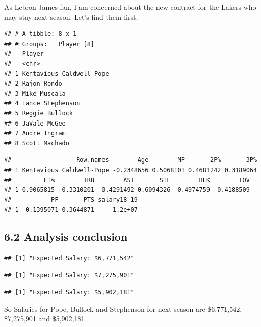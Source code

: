 \documentclass[]{article}
\begin{document}
As Lebron James fan, I am concerned about the new contract for the
Lakers who may stay next season. Let's find them first.

\begin{verbatim}
## # A tibble: 8 x 1
## # Groups:   Player [8]
##   Player                  
##   <chr>                   
## 1 Kentavious Caldwell-Pope
## 2 Rajon Rondo             
## 3 Mike Muscala            
## 4 Lance Stephenson        
## 5 Reggie Bullock          
## 6 JaVale McGee            
## 7 Andre Ingram            
## 8 Scott Machado
\end{verbatim}

\begin{verbatim}
##                  Row.names        Age        MP       2P%       3P%
## 1 Kentavious Caldwell-Pope -0.2348656 0.5068101 0.4681242 0.3189064
##         FT%        TRB        AST       STL        BLK        TOV
## 1 0.9065815 -0.3310201 -0.4291492 0.6094326 -0.4974759 -0.4188509
##           PF       PTS salary18_19
## 1 -0.1395071 0.3644871     1.2e+07
\end{verbatim}

\subsection{6.2 Analysis conclusion}\label{analysis-conclusion}

\begin{verbatim}
## [1] "Expected Salary: $6,771,542"
\end{verbatim}

\begin{verbatim}
## [1] "Expected Salary: $7,275,901"
\end{verbatim}

\begin{verbatim}
## [1] "Expected Salary: $5,902,181"
\end{verbatim}

So Salaries for Pope, Bullock and Stephenson for next season are
\$6,771,542, \$7,275,901 and \$5,902,181
\end{document}

